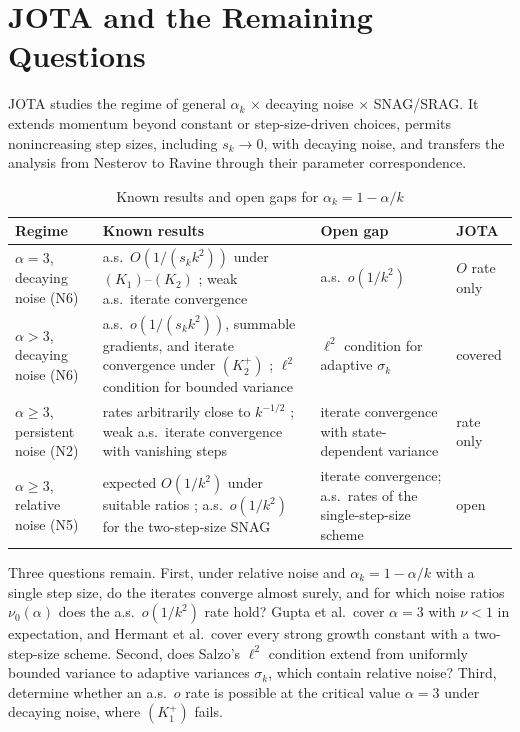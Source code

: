 \documentclass[11pt]{article}
\begin{document}
\section{JOTA and the Remaining Questions}

JOTA studies the regime of general $\alpha_k$ $\times$ decaying noise $\times$ SNAG/SRAG. It extends momentum beyond constant or step-size-driven choices, permits nonincreasing step sizes, including $s_k\to0$, with decaying noise, and transfers the analysis from Nesterov to Ravine through their parameter correspondence.

\begin{table}[htbp]
\centering
\small
\caption{Known results and open gaps for $\alpha_k=1-\alpha/k$}
\label{tab:gaps}
\begin{tabularx}{\textwidth}{@{}p{2.2cm}YYp{1.6cm}@{}}
\toprule
Regime & Known results & Open gap & JOTA \\
\midrule
$\alpha=3$, decaying noise (N6) & a.s.\ $O(1/(s_kk^2))$ under $(K_1)$--$(K_2)$ \citep{attouch2026ravine}; weak a.s.\ iterate convergence \citep{salzo2025iterates} & a.s.\ $o(1/k^2)$ & $O$ rate only \\
$\alpha>3$, decaying noise (N6) & a.s.\ $o(1/(s_kk^2))$, summable gradients, and iterate convergence under $(K_2^+)$ \citep{attouch2026ravine}; $\ell^2$ condition for bounded variance \citep{salzo2025iterates} & $\ell^2$ condition for adaptive $\sigma_k$ & covered \\
$\alpha\ge3$, persistent noise (N2) & rates arbitrarily close to $k^{-1/2}$ \citep{attouch2026ravine,sebbouh2021,liu2022}; weak a.s.\ iterate convergence with vanishing steps \citep{salzo2025iterates} & iterate convergence with state-dependent variance & rate only \\
$\alpha\ge3$, relative noise (N5) & expected $O(1/k^2)$ under suitable ratios \citep{vaswani2019fast,gupta2024nesterov}; a.s.\ $o(1/k^2)$ for the two-step-size SNAG \citep{hermant2025gradient} & iterate convergence; a.s.\ rates of the single-step-size scheme & open \\
\bottomrule
\end{tabularx}
\end{table}

Three questions remain. First, under relative noise and $\alpha_k=1-\alpha/k$ with a single step size, do the iterates converge almost surely, and for which noise ratios $\nu_0(\alpha)$ does the a.s.\ $o(1/k^2)$ rate hold? Gupta et al.\ cover $\alpha=3$ with $\nu<1$ in expectation, and Hermant et al.\ cover every strong growth constant with a two-step-size scheme. Second, does Salzo's $\ell^2$ condition extend from uniformly bounded variance to adaptive variances $\sigma_k$, which contain relative noise? Third, determine whether an a.s.\ $o$ rate is possible at the critical value $\alpha=3$ under decaying noise, where $(K_1^+)$ fails.
\end{document}
